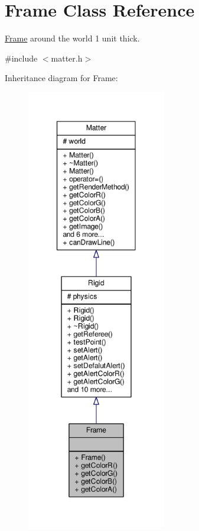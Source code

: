 \hypertarget{classFrame}{}\section{Frame Class Reference}
\label{classFrame}


\hyperlink{classFrame}{Frame} around the world 1 unit thick.  




{\ttfamily \#include $<$matter.\+h$>$}



Inheritance diagram for Frame\+:\nopagebreak
\begin{figure}[H]
\begin{center}
\leavevmode
\includegraphics[height=550pt]{classFrame__inherit__graph}
\end{center}
\end{figure}


